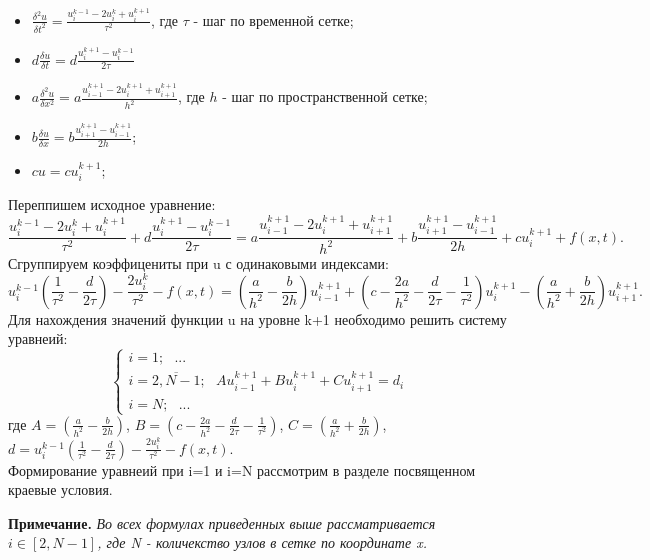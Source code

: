 \documentclass[12pt]{article}
\begin{document}
\begin{enumerate}
\begin{itemize}
            \item $\frac{\delta^2 u}{\delta t^2} = \frac{u_{i}^{k-1}-2u_{i}^k+u_{i}^{k+1}}{\tau^2}$, где  $\tau$ - шаг по временной сетке;
            \item $d\frac{\delta u}{\delta t}=d\frac{u_i^{k+1}-u_i^{k-1}}{2\tau}$
            \item $a\frac{\delta^2 u}{\delta x^2} = a\frac{u_{i-1}^{k+1}-2u_{i}^{k+1}+u_{i+1}^{k+1}}{h^2}$, где  $h$ - шаг по пространственной сетке;
            \item $b\frac{\delta u}{\delta x} = b\frac{u_{i+1}^{k+1}-u_{i-1}^{k+1}}{2h}$;
            \item $cu = cu_{i}^{k+1}$;
        \end{itemize}
        Переппишем исходное уравнение:
        $$\frac{u_{i}^{k-1}-2u_{i}^k+u_{i}^{k+1}}{\tau^2}+d\frac{u_i^{k+1}-u_i^{k-1}}{2\tau} =a\frac{u_{i-1}^{k+1}-2u_{i}^{k+1}+u_{i+1}^{k+1}}{h^2}+b\frac{u_{i+1}^{k+1}-u_{i-1}^{k+1}}{2h}+cu_{i}^{k+1}+f(x,t).$$
        Сгруппируем коэффицениты при u с одинаковыми индексами:
        $$u_i^{k-1}\left(\frac{1}{\tau^2}-\frac{d}{2\tau}\right)-\frac{2u_i^k}{\tau^2}-f(x,t) = \left(\frac{a}{h^2}-\frac{b}{2h} \right)u_{i-1}^{k+1} + \left(c-\frac{2a}{h^2}-\frac{d}{2\tau}-\frac{1}{\tau^2}\right)u_i^{k+1} -
        \left(\frac{a}{h^2}+\frac{b}{2h}\right)u_{i+1}^{k+1}.$$
        Для нахождения значений функции u на уровне k+1 необходимо решить систему уравнеий:
        \begin{equation*}
            \begin{cases}
                i=1;\:\:\: ...
                \\
                i=\overline{2,N-1};\:\:\:Au_{i-1}^{k+1} + Bu_i^{k+1} +Cu_{i+1}^{k+1}=d_i
                \\
                i=N;\:\:\: ...
            \end{cases}
        \end{equation*}
        где $A = \left(\frac{a}{h^2}-\frac{b}{2h} \right) $, $B = \left(c-\frac{2a}{h^2}-\frac{d}{2\tau}-\frac{1}{\tau^2}\right)$, $C = \left(\frac{a}{h^2}+\frac{b}{2h}\right)$, 
        $d = u_i^{k-1}\left(\frac{1}{\tau^2}-\frac{d}{2\tau}\right)-\frac{2u_i^k}{\tau^2}-f(x,t)$.\\
        Формирование уравнеий при i=1 и i=N рассмотрим в разделе посвященном краевые условия.
    \end{enumerate}
    \textbf{Примечание.}
    \emph{Во всех формулах приведенных выше рассматривается $i \in [2,N-1]$, где N - количекство узлов в сетке по координате x.}
\end{document}
